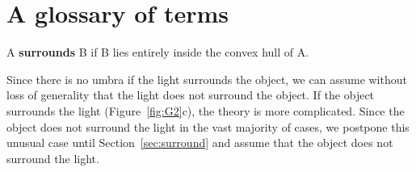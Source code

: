 \documentclass[9pt,twocolumn]{article}
\begin{document}

\clearpage

\section{A glossary of terms}

\begin{defn2}
\label{defn:surround}
A {\bf surrounds} B if B lies entirely inside the convex hull of A.
\end{defn2}

Since there is no umbra if the light surrounds the object, 
we can assume without loss of generality 
that the light does not surround the object.
If the object surrounds the light (Figure~\ref{fig:G2}c),
the theory is more complicated.
Since the object does not surround the light in the vast majority
of cases, we postpone this unusual case until Section~\ref{sec:surround}
and assume that the object does not surround the light.
\end{document}
